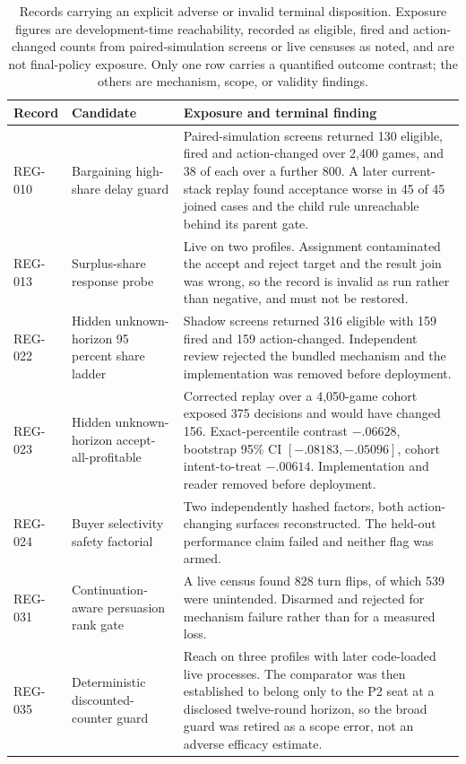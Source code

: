 \begin{table}[H]
\centering
\scriptsize
\caption{Records carrying an explicit adverse or invalid terminal disposition.
Exposure figures are development-time reachability, recorded as eligible,
fired and action-changed counts from paired-simulation screens or live
censuses as noted, and are not final-policy exposure. Only one row carries a
quantified outcome contrast; the others are mechanism, scope, or validity
findings.}
\label{tab:adverse-records}
\setlength{\tabcolsep}{3.0pt}
\renewcommand{\arraystretch}{0.94}
\begin{tabularx}{\linewidth}{@{}>{\raggedright\arraybackslash}p{1.15cm}>{\raggedright\arraybackslash}p{3.0cm}Y@{}}
\toprule
Record & Candidate & Exposure and terminal finding \\
\midrule
REG-010 & Bargaining high-share delay guard & Paired-simulation screens returned 130 eligible, fired and action-changed over 2,400 games, and 38 of each over a further 800. A later current-stack replay found acceptance worse in 45 of 45 joined cases and the child rule unreachable behind its parent gate. \\
REG-013 & Surplus-share response probe & Live on two profiles. Assignment contaminated the accept and reject target and the result join was wrong, so the record is invalid as run rather than negative, and must not be restored. \\
REG-022 & Hidden unknown-horizon 95 percent share ladder & Shadow screens returned 316 eligible with 159 fired and 159 action-changed. Independent review rejected the bundled mechanism and the implementation was removed before deployment. \\
REG-023 & Hidden unknown-horizon accept-all-profitable & Corrected replay over a 4,050-game cohort exposed 375 decisions and would have changed 156. Exact-percentile contrast $-.06628$, bootstrap 95\% CI $[-.08183,-.05096]$, cohort intent-to-treat $-.00614$. Implementation and reader removed before deployment. \\
REG-024 & Buyer selectivity safety factorial & Two independently hashed factors, both action-changing surfaces reconstructed. The held-out performance claim failed and neither flag was armed. \\
REG-031 & Continuation-aware persuasion rank gate & A live census found 828 turn flips, of which 539 were unintended. Disarmed and rejected for mechanism failure rather than for a measured loss. \\
REG-035 & Deterministic discounted-counter guard & Reach on three profiles with later code-loaded live processes. The comparator was then established to belong only to the P2 seat at a disclosed twelve-round horizon, so the broad guard was retired as a scope error, not an adverse efficacy estimate. \\
\bottomrule
\end{tabularx}
\end{table}

